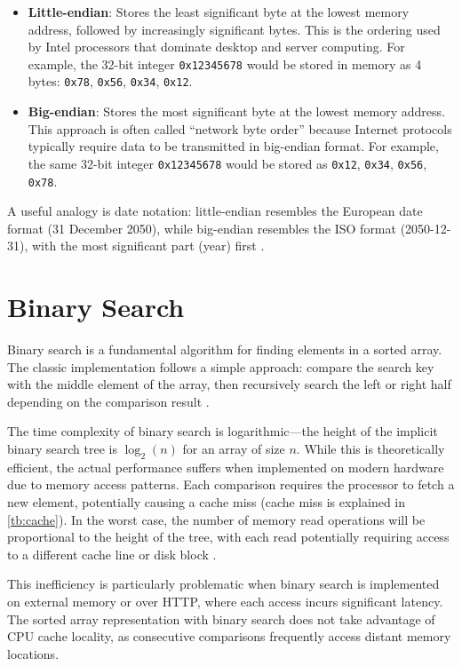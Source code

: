 \begin{itemize}
  \item \textbf{Little-endian}: Stores the least significant byte at the lowest memory address, followed by increasingly significant bytes. This is the ordering used by Intel processors that dominate desktop and server computing. For example, the 32-bit integer \texttt{0x12345678} would be stored in memory as 4 bytes: \texttt{0x78}, \texttt{0x56}, \texttt{0x34}, \texttt{0x12}.

  \item \textbf{Big-endian}: Stores the most significant byte at the lowest memory address. This approach is often called ``network byte order'' because Internet protocols typically require data to be transmitted in big-endian format. For example, the same 32-bit integer \texttt{0x12345678} would be stored as \texttt{0x12}, \texttt{0x34}, \texttt{0x56}, \texttt{0x78}.
\end{itemize}

A useful analogy is date notation: little-endian resembles the European date format (31 December 2050), while big-endian resembles the ISO format (2050-12-31), with the most significant part (year) first \citep{endianness_mdn}.

\section{Binary Search}
\label{tb:binary_search}

Binary search is a fundamental algorithm for finding elements in a sorted array. The classic implementation follows a simple approach: compare the search key with the middle element of the array, then recursively search the left or right half depending on the comparison result \citep{binary_search}.

The time complexity of binary search is logarithmic—the height of the implicit binary search tree is $\log_2(n)$ for an array of size $n$. While this is theoretically efficient, the actual performance suffers when implemented on modern hardware due to memory access patterns. Each comparison requires the processor to fetch a new element, potentially causing a cache miss (cache miss is explained in \autoref{tb:cache}). In the worst case, the number of memory read operations will be proportional to the height of the tree, with each read potentially requiring access to a different cache line or disk block \citep{binary_search}.

This inefficiency is particularly problematic when binary search is implemented on external memory or over HTTP, where each access incurs significant latency. The sorted array representation with binary search does not take advantage of CPU cache locality, as consecutive comparisons frequently access distant memory locations.

